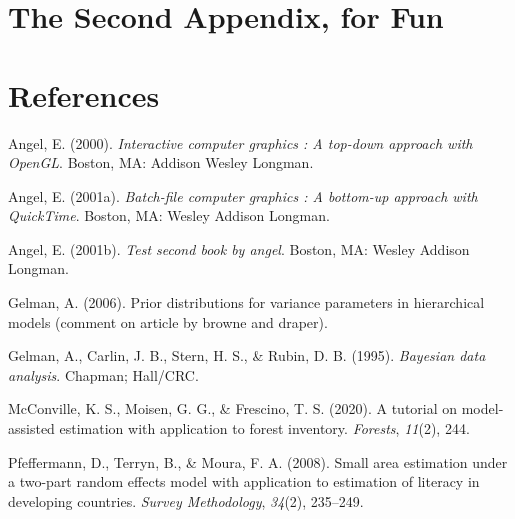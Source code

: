 \documentclass[12pt,twoside]{reedthesis}
\newlength{\cslhangindent}
\newenvironment{CSLReferences}[2] %
 {%
  \setlength{\parindent}{0pt}
  \ifodd #1 \everypar{\setlength{\hangindent}{\cslhangindent}}\ignorespaces\fi
  \ifnum #2 > 0
  \setlength{\parskip}{#2\baselineskip}
  \fi
 }%
 {}
\begin{document}
\hypertarget{the-second-appendix-for-fun}{%
\chapter{The Second Appendix, for Fun}\label{the-second-appendix-for-fun}}

\backmatter

\hypertarget{references}{%
\chapter*{References}\label{references}}


\noindent

\setlength{\parindent}{-0.20in}

\hypertarget{refs}{}
\begin{CSLReferences}{1}{0}
\leavevmode{}%
Angel, E. (2000). \emph{Interactive computer graphics : A top-down approach with OpenGL}. Boston, MA: Addison Wesley Longman.

\leavevmode{}%
Angel, E. (2001a). \emph{Batch-file computer graphics : A bottom-up approach with QuickTime}. Boston, MA: Wesley Addison Longman.

\leavevmode{}%
Angel, E. (2001b). \emph{Test second book by angel}. Boston, MA: Wesley Addison Longman.

\leavevmode{}%
Gelman, A. (2006). Prior distributions for variance parameters in hierarchical models (comment on article by browne and draper).

\leavevmode{}%
Gelman, A., Carlin, J. B., Stern, H. S., \& Rubin, D. B. (1995). \emph{Bayesian data analysis}. Chapman; Hall/CRC.

\leavevmode{}%
McConville, K. S., Moisen, G. G., \& Frescino, T. S. (2020). A tutorial on model-assisted estimation with application to forest inventory. \emph{Forests}, \emph{11}(2), 244.

\leavevmode{}%
Pfeffermann, D., Terryn, B., \& Moura, F. A. (2008). Small area estimation under a two-part random effects model with application to estimation of literacy in developing countries. \emph{Survey Methodology}, \emph{34}(2), 235--249.

\end{CSLReferences}

\end{document}

